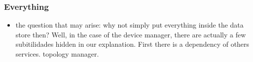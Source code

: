 \subsubsection{Everything}
\begin{itemize}
\item the question that may arise: why not simply put everything inside the
  data store then? Well, in the case of the device manager, there are
  actually a few subitilidades hidden in our explanation. First there
  is a dependency of others services. topology manager. 
\end{itemize}




